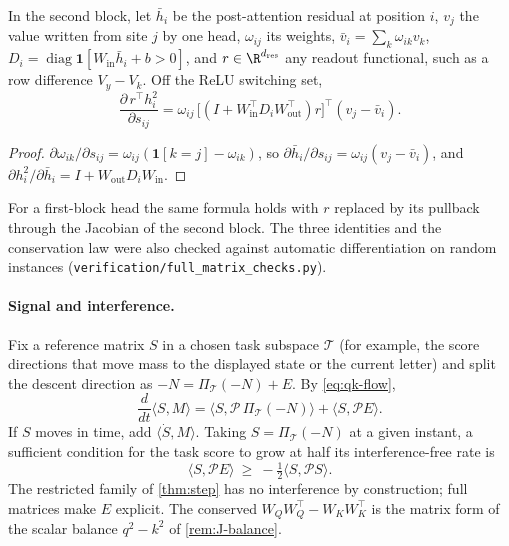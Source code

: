 \begin{proposition}\label{prop:score-sens}
In the second block, let $\bar h_i$ be the post-attention residual at position $i$, $v_j$ the value written from site $j$ by one head,
$\omega_{ij}$ its weights, $\bar v_i=\sum_k\omega_{ik}v_k$, $D_i=\operatorname{diag}\mathbf 1[W_{\mathrm{in}}\bar h_i+b>0]$, and $r\in\R^{d_{\mathrm{res}}}$ any readout
functional, such as a row difference $V_y-V_k$. Off the ReLU switching set,
\begin{equation}\label{eq:score-sens}
 \frac{\partial\,r^\top h_i^2}{\partial s_{ij}}=\omega_{ij}\,\bigl[(I+W_{\mathrm{in}}^\top D_iW_{\mathrm{out}}^\top)r\bigr]^\top(v_j-\bar v_i).
\end{equation}
\end{proposition}
\begin{proof}
$\partial\omega_{ik}/\partial s_{ij}=\omega_{ij}(\mathbf 1[k=j]-\omega_{ik})$, so $\partial\bar h_i/\partial s_{ij}=\omega_{ij}(v_j-\bar v_i)$, and
$\partial h_i^2/\partial\bar h_i=I+W_{\mathrm{out}}D_iW_{\mathrm{in}}$.
\end{proof}
For a first-block head the same formula holds with $r$ replaced by its pullback through the Jacobian of the second block. The three identities and the conservation law were also checked against automatic differentiation on random instances (\texttt{verification/full\_matrix\_checks.py}).

\paragraph{Signal and interference.} Fix a reference matrix $S$ in a chosen task subspace $\mathcal T$ (for example, the score directions that
move mass to the displayed state or the current letter) and split the descent direction as $-N=\Pi_{\mathcal T}(-N)+E$. By
\cref{eq:qk-flow},
\[
 \frac{d}{dt}\langle S,M\rangle=\langle S,\mathcal P\,\Pi_{\mathcal T}(-N)\rangle+\langle S,\mathcal PE\rangle .
\]
If $S$ moves in time, add $\langle\dot S,M\rangle$. Taking $S=\Pi_{\mathcal T}(-N)$ at a given instant, a sufficient condition for the task score to
grow at half its interference-free rate is
\begin{equation}\label{eq:interference}
 \langle S,\mathcal PE\rangle\ \ge\ -\tfrac12\langle S,\mathcal PS\rangle .
\end{equation}
The restricted family of \cref{thm:step} has no interference by construction; full matrices make $E$ explicit. The conserved $W_QW_Q^\top-W_KW_K^\top$ is the matrix form of the scalar balance $q^2-k^2$ of \cref{rem:J-balance}.

